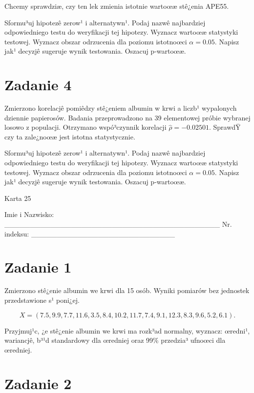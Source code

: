 \documentclass[a4paper,12pt]{article}
\begin{document}
  Chcemy sprawdziæ, czy ten lek zmienia istotnie wartoœæ stê¿enia APE55.
  
  Sformu³uj hipotezê zerow¹ i alternatywn¹. 
  Podaj nazwê najbardziej odpowiedniego testu do weryfikacji tej hipotezy. 
  Wyznacz wartoœæ statystyki testowej. 
  Wyznacz obszar odrzucenia dla poziomu istotnoœci $\alpha=0.05$. 
  Napisz jak¹ decyzjê sugeruje wynik testowania. Oszacuj p-wartoœæ. \vspace{1cm} 

  \section*{Zadanie 4}
     
     Zmierzono korelacjê pomiêdzy stê¿eniem albumin w krwi a liczb¹ wypalonych dziennie papierosów. 
     Badania przeprowadzono na 39 elementowej próbie wybranej losowo z populacji. 
     Otrzymano wspó³czynnik korelacji $\hat\rho = -0.02501 $. 
     SprawdŸ czy ta zale¿noœæ jest istotna statystycznie. 
     
     Sformu³uj hipotezê zerow¹ i alternatywn¹. 
     Podaj nazwê najbardziej odpowiedniego testu do weryfikacji tej hipotezy. 
     Wyznacz wartoœæ statystyki testowej. 
     Wyznacz obszar odrzucenia dla poziomu istotnoœci $\alpha=0.05$. 
     Napisz jak¹ decyzjê sugeruje wynik testowania. 
     Oszacuj p-wartoœæ. \vspace{1cm} 

  \clearpage  Karta  25  

 Imie i Nazwisko: \_\_\_\_\_\_\_\_\_\_\_\_\_\_\_\_\_\_\_\_\_\_\_\_\_\_\_\_\_\_\_\_\_\_\_\_\_\_\_\_\_\_ Nr. indeksu: \_\_\_\_\_\_\_\_\_\_\_\_\_\_\_\_\_\_\_\_\_\_\_\_\_\_\_\_ 
 \section*{Zadanie 1}
     
     Zmierzono stê¿enie albumin we krwi dla 15 osób. 
     Wyniki pomiarów bez jednostek przedstawione s¹ poni¿ej. 
     
     \noindent $$X=(  7.5,  9.9,  7.7, 11.6,  3.5,  8.4, 10.2, 11.7,  7.4,  9.1, 12.3,  8.3,  9.6,  5.2,  6.1 ).$$
     
     Przyjmuj¹c, ¿e stê¿enie albumin we krwi ma rozk³ad normalny, 
     wyznacz: œredni¹, wariancjê, b³¹d standardowy dla œredniej oraz 99\% przedzia³ ufnoœci dla œredniej. \vspace{1cm} 

  \section*{Zadanie 2}
     
\end{document}
